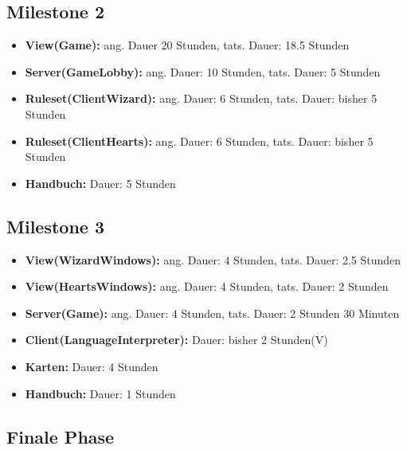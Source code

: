 \documentclass{article}
\begin{document}
\subsection{Milestone 2}
\begin{itemize}
\item \textbf{View(Game):} ang. Dauer 20 Stunden, tats. Dauer: 18.5 Stunden
\item \textbf{Server(GameLobby):} ang. Dauer: 10 Stunden, tats. Dauer: 5 Stunden 
\item \textbf{Ruleset(ClientWizard):} ang. Dauer: 6 Stunden, tats. Dauer: bisher 5 Stunden
\item \textbf{Ruleset(ClientHearts):} ang. Dauer: 6 Stunden, tats. Dauer: bisher 5 Stunden
\item \textbf{Handbuch:} Dauer: 5 Stunden
\end{itemize}


\subsection{Milestone 3}
\begin{itemize}
\item \textbf{View(WizardWindows):} ang. Dauer: 4 Stunden, tats. Dauer: 2.5 Stunden
\item \textbf{View(HeartsWindows):} ang. Dauer: 4 Stunden, tats. Dauer: 2 Stunden
\item \textbf{Server(Game):} ang. Dauer: 4 Stunden, tats. Dauer: 2 Stunden 30 Minuten
\item \textbf{Client(LanguageInterpreter):} Dauer: bisher 2 Stunden(V)
\item \textbf{Karten:} Dauer: 4 Stunden
\item \textbf{Handbuch:} Dauer: 1 Stunden
\end{itemize}

 
\subsection{Finale Phase}
\end{document}
